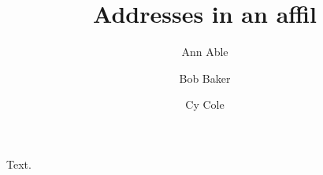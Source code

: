 \documentclass{article}
\begin{document}
\title{Addresses in an affil}
\author[1]{Ann Able}
\author[1]{Bob Baker}
\author[2]{Cy Cole}
\date{}
\maketitle
Text.
\end{document}
